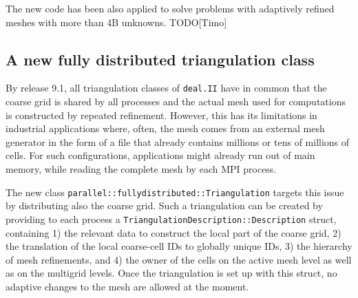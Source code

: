 \documentclass{ansarticle-preprint}
\begin{document}
The new code has been also applied to solve problems with adaptively refined 
meshes with more than 4B unknowns. {\color{red}TODO[Timo]}


\subsection{A new fully distributed triangulation class}
\label{subsec:pft}

By release 9.1, all triangulation classes of \texttt{deal.II} have in common that the coarse grid is shared by 
all processes and the actual mesh used for computations is constructed by repeated 
refinement. However, this has its limitations in industrial applications where, often, the mesh comes 
from an external mesh generator in the form of a file that already contains millions 
or tens of millions of cells. For such configurations, applications might already 
run out of  main memory, while reading the complete mesh by each MPI process. 

The new class \texttt{parallel::fullydistributed::Triangulation} targets this issue 
by distributing also the coarse grid. Such 
a triangulation can be created by providing to each process a \texttt{Triangulation\-De\-scrip\-tion::Description} struct, containing 
1) the relevant data to construct the local part of the coarse grid, 2) the 
translation of the local coarse-cell IDs to globally unique IDs, 3) the hierarchy 
of mesh refinements, and 4) the owner of the cells on the active mesh level as well 
as on the multigrid levels. Once the triangulation is set up with this struct, no adaptive
changes to the mesh are allowed at the moment.
 
\end{document}
